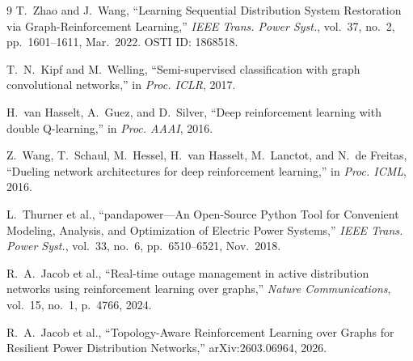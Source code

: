 \documentclass[11pt]{article}
\begin{document}
\begin{thebibliography}{9}
T.~Zhao and J.~Wang, ``Learning Sequential Distribution System Restoration via Graph-Reinforcement Learning,'' \textit{IEEE Trans. Power Syst.}, vol.~37, no.~2, pp.~1601--1611, Mar.~2022. OSTI ID: 1868518.

T.~N.~Kipf and M.~Welling, ``Semi-supervised classification with graph convolutional networks,'' in \textit{Proc. ICLR}, 2017.

H.~van Hasselt, A.~Guez, and D.~Silver, ``Deep reinforcement learning with double Q-learning,'' in \textit{Proc. AAAI}, 2016.

Z.~Wang, T.~Schaul, M.~Hessel, H.~van Hasselt, M.~Lanctot, and N.~de Freitas, ``Dueling network architectures for deep reinforcement learning,'' in \textit{Proc. ICML}, 2016.

L.~Thurner et al., ``pandapower---An Open-Source Python Tool for Convenient Modeling, Analysis, and Optimization of Electric Power Systems,'' \textit{IEEE Trans. Power Syst.}, vol.~33, no.~6, pp.~6510--6521, Nov.~2018.

R.~A.~Jacob et al., ``Real-time outage management in active distribution networks using reinforcement learning over graphs,'' \textit{Nature Communications}, vol.~15, no.~1, p.~4766, 2024.

R.~A.~Jacob et al., ``Topology-Aware Reinforcement Learning over Graphs for Resilient Power Distribution Networks,'' arXiv:2603.06964, 2026.
\end{thebibliography}
\end{document}
